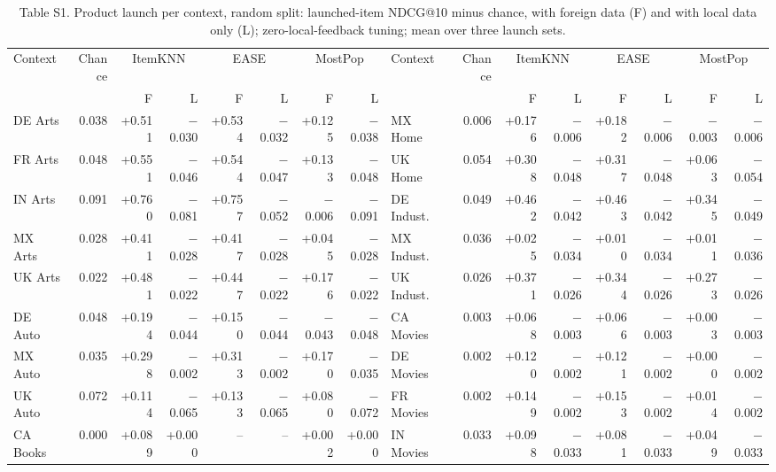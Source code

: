 \begin{table}[H]
\caption{Table S1. Product launch per context, random split: launched-item NDCG@10 minus chance, with foreign data (F) and with local data only (L); zero-local-feedback tuning; mean over three launch sets.}
\centering\scriptsize\setlength{\tabcolsep}{2.2pt}
\begin{tabular}{lrrrrrrr@{\hspace{10pt}}lrrrrrrr}
\toprule
Context & Chance & \multicolumn{2}{c}{ItemKNN} & \multicolumn{2}{c}{EASE} & \multicolumn{2}{c}{MostPop} & Context & Chance & \multicolumn{2}{c}{ItemKNN} & \multicolumn{2}{c}{EASE} & \multicolumn{2}{c}{MostPop} \\
\cmidrule(lr){3-4}\cmidrule(lr){5-6}\cmidrule(lr){7-8}\cmidrule(lr){11-12}\cmidrule(lr){13-14}\cmidrule(lr){15-16}
 & & F & L & F & L & F & L & & & F & L & F & L & F & L \\
\midrule
DE Arts & 0.038 & +0.511 & $-$0.030 & +0.534 & $-$0.032 & +0.125 & $-$0.038 & MX Home & 0.006 & +0.176 & $-$0.006 & +0.182 & $-$0.006 & $-$0.003 & $-$0.006 \\
FR Arts & 0.048 & +0.551 & $-$0.046 & +0.544 & $-$0.047 & +0.133 & $-$0.048 & UK Home & 0.054 & +0.308 & $-$0.048 & +0.317 & $-$0.048 & +0.063 & $-$0.054 \\
IN Arts & 0.091 & +0.760 & $-$0.081 & +0.757 & $-$0.052 & $-$0.006 & $-$0.091 & DE Indust. & 0.049 & +0.462 & $-$0.042 & +0.463 & $-$0.042 & +0.345 & $-$0.049 \\
MX Arts & 0.028 & +0.411 & $-$0.028 & +0.417 & $-$0.028 & +0.045 & $-$0.028 & MX Indust. & 0.036 & +0.025 & $-$0.034 & +0.010 & $-$0.034 & +0.011 & $-$0.036 \\
UK Arts & 0.022 & +0.481 & $-$0.022 & +0.447 & $-$0.022 & +0.176 & $-$0.022 & UK Indust. & 0.026 & +0.371 & $-$0.026 & +0.344 & $-$0.026 & +0.273 & $-$0.026 \\
DE Auto & 0.048 & +0.194 & $-$0.044 & +0.150 & $-$0.044 & $-$0.043 & $-$0.048 & CA Movies & 0.003 & +0.068 & $-$0.003 & +0.066 & $-$0.003 & +0.003 & $-$0.003 \\
MX Auto & 0.035 & +0.298 & $-$0.002 & +0.313 & $-$0.002 & +0.170 & $-$0.035 & DE Movies & 0.002 & +0.120 & $-$0.002 & +0.121 & $-$0.002 & +0.000 & $-$0.002 \\
UK Auto & 0.072 & +0.114 & $-$0.065 & +0.133 & $-$0.065 & +0.080 & $-$0.072 & FR Movies & 0.002 & +0.149 & $-$0.002 & +0.153 & $-$0.002 & +0.014 & $-$0.002 \\
CA Books & 0.000 & +0.089 & +0.000 & -- & -- & +0.002 & +0.000 & IN Movies & 0.033 & +0.098 & $-$0.033 & +0.081 & $-$0.033 & +0.049 & $-$0.033 \\

\end{tabular}
\end{table}
